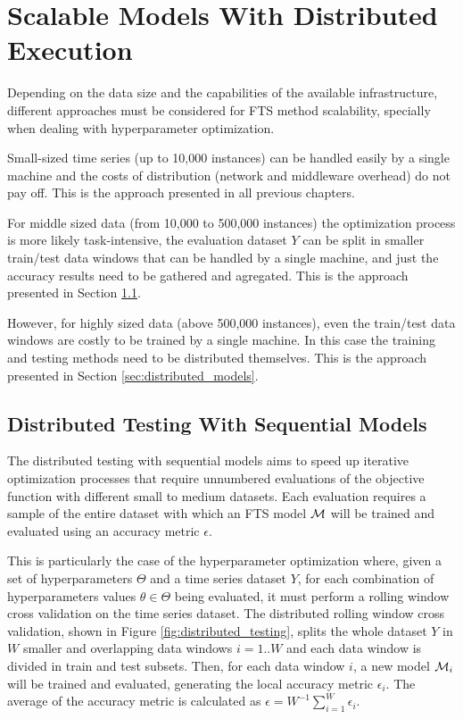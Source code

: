 \section{Scalable Models With Distributed Execution}
\label{sec:distributed}

Depending on the data size and the capabilities of the available infrastructure, different approaches must be considered for FTS method scalability, specially when dealing with hyperparameter optimization.

Small-sized time series (up to 10,000 instances) can be handled easily by a single machine and the costs of distribution (network and middleware overhead) do not pay off. This is the approach presented in all previous chapters.

For middle sized data (from 10,000 to 500,000 instances) the optimization process is more likely task-intensive, the evaluation dataset $Y$ can be split in smaller train/test data windows that can be handled by a single machine, and just the accuracy results need to be gathered and agregated. This is the approach presented in Section \ref{sec:distributed_testing}.

However, for highly sized data (above 500,000 instances), even the train/test data windows are costly to be trained by a single machine. In this case the training and testing methods need to be distributed themselves. This is the approach presented in Section \ref{sec:distributed_models}.



\subsection{Distributed Testing With Sequential Models}
\label{sec:distributed_testing}

The distributed testing with sequential models aims to speed up iterative optimization processes that require unnumbered evaluations of the objective function with different small to medium datasets. Each evaluation requires a sample of the entire dataset with which an FTS model $\mathcal{M}$ will be trained and evaluated using an accuracy metric $\epsilon$.

This is particularly the case of the hyperparameter optimization where, given a set of hyperparameters $\Theta$ and a time series dataset $Y$, for each combination of hyperparameters values $\theta \in \Theta$ being evaluated, it must perform a rolling window cross validation on the time series dataset. The distributed rolling window cross validation, shown in Figure \ref{fig:distributed_testing}, splits the whole dataset $Y$ in $W$ smaller and overlapping data windows $i=1..W$ and each data window is divided in train and test subsets. Then, for each data window $i$, a new model $\mathcal{M}_i$ will be trained and evaluated, generating the local accuracy metric $\epsilon_i$. The average of the accuracy metric is calculated as $\epsilon = W^{-1} \sum_{i=1}^W \epsilon_i$.

